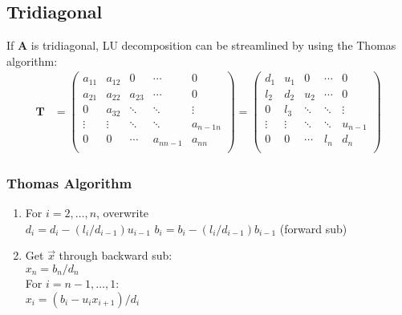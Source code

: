 \documentclass[12pt]{exam}
\newcommand{\ve}[1]{\ensuremath{\mathbf{#1}}}
\begin{document}
\subsection*{Tridiagonal}
If $\ve{A}$ is tridiagonal, LU decomposition can be streamlined by using the Thomas algorithm:
%
\begin{align}
    \ve{T} &= \begin{pmatrix}
      a_{11} & a_{12} & 0      & \cdots    & 0 \\
      a_{21} & a_{22} & a_{23} & \cdots    & 0 \\
      0      & a_{32} & \ddots & \ddots    & \vdots \\     
      \vdots & \vdots & \ddots & \ddots    & a_{n-1 n}\\
      0      & 0      & \cdots & a_{n n-1} & a_{nn} \\
    \end{pmatrix} =
    \begin{pmatrix}
      d_{1}  & u_{1}  & 0      & \cdots & 0 \\
      l_{2}  & d_{2}  & u_{2}  & \cdots & 0 \\
      0      & l_{3}  & \ddots & \ddots & \vdots \\     
      \vdots & \vdots & \ddots & \ddots & u_{n-1}\\
      0      & 0      & \cdots & l_{n}  & d_{n} \\
    \end{pmatrix} \nonumber   
\end{align} 

\subsubsection*{Thomas Algorithm}
\begin{enumerate}
\item For $i=2, \dots, n$, overwrite\\
  \hspace*{1 em} $d_i = d_i - (l_i / d_{i-1}) u_{i-1}$
  \hspace*{1 em} $b_i = b_i - (l_i / d_{i-1}) b_{i-1}$ (forward sub)

\item Get $\vec{x}$ through backward sub:\\
$x_n = b_n / d_n$\\
For $i = n-1, \dots, 1$:\\
  \hspace*{1 em} $x_i = (b_i - u_i x_{i+1}) / d_i$
\end{enumerate}



 
\end{document}
